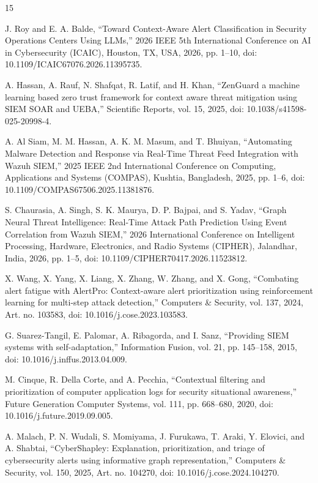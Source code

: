 \documentclass[10pt,letterpaper]{article}
\begin{document}
\begin{thebibliography}{15}
\scriptsize
\setlength{\itemsep}{0pt}
\setlength{\parskip}{0pt}
\setlength{\parsep}{0pt}

 J. Roy and E. A. Balde, ``Toward Context-Aware Alert Classification in Security Operations Centers Using LLMs,'' 2026 IEEE 5th International Conference on AI in Cybersecurity (ICAIC), Houston, TX, USA, 2026, pp. 1--10, doi: 10.1109/ICAIC67076.2026.11395735.

 A. Hassan, A. Rauf, N. Shafqat, R. Latif, and H. Khan, ``ZenGuard a machine learning based zero trust framework for context aware threat mitigation using SIEM SOAR and UEBA,'' Scientific Reports, vol. 15, 2025, doi: 10.1038/s41598-025-20998-4.

 A. Al Siam, M. M. Hassan, A. K. M. Masum, and T. Bhuiyan, ``Automating Malware Detection and Response via Real-Time Threat Feed Integration with Wazuh SIEM,'' 2025 IEEE 2nd International Conference on Computing, Applications and Systems (COMPAS), Kushtia, Bangladesh, 2025, pp. 1--6, doi: 10.1109/COMPAS67506.2025.11381876.

 S. Chaurasia, A. Singh, S. K. Maurya, D. P. Bajpai, and S. Yadav, ``Graph Neural Threat Intelligence: Real-Time Attack Path Prediction Using Event Correlation from Wazuh SIEM,'' 2026 International Conference on Intelligent Processing, Hardware, Electronics, and Radio Systems (CIPHER), Jalandhar, India, 2026, pp. 1--5, doi: 10.1109/CIPHER70417.2026.11523812.

 X. Wang, X. Yang, X. Liang, X. Zhang, W. Zhang, and X. Gong, ``Combating alert fatigue with AlertPro: Context-aware alert prioritization using reinforcement learning for multi-step attack detection,'' Computers \& Security, vol. 137, 2024, Art. no. 103583, doi: 10.1016/j.cose.2023.103583.

 G. Suarez-Tangil, E. Palomar, A. Ribagorda, and I. Sanz, ``Providing SIEM systems with self-adaptation,'' Information Fusion, vol. 21, pp. 145--158, 2015, doi: 10.1016/j.inffus.2013.04.009.

 M. Cinque, R. Della Corte, and A. Pecchia, ``Contextual filtering and prioritization of computer application logs for security situational awareness,'' Future Generation Computer Systems, vol. 111, pp. 668--680, 2020, doi: 10.1016/j.future.2019.09.005.

 A. Malach, P. N. Wudali, S. Momiyama, J. Furukawa, T. Araki, Y. Elovici, and A. Shabtai, ``CyberShapley: Explanation, prioritization, and triage of cybersecurity alerts using informative graph representation,'' Computers \& Security, vol. 150, 2025, Art. no. 104270, doi: 10.1016/j.cose.2024.104270.


\end{thebibliography}
\end{document}
